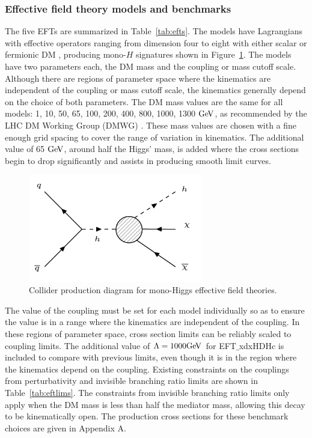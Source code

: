 \subsubsection{Effective field theory models and benchmarks}

The five EFTs are summarized in Table~\ref{tab:efts}. The models have Lagrangians with effective operators ranging from dimension four to eight with either scalar or fermionic DM \cite{McDonald:1993ex, LopezHonorez:2012kv}, producing mono-$H$ signatures shown in Figure~\ref{fig:eftsig}. The models have two parameters each, the DM mass and the coupling or mass cutoff scale. Although there are regions of parameter space where the kinematics are independent of the coupling or mass cutoff scale, the kinematics generally depend on the choice of both parameters. The DM mass values are the same for all models: 1, 10, 50, 65, 100, 200, 400, 800, 1000, 1300 $\mathrm{Ge\kern -0.1em V}$, as recommended by the LHC DM Working Group (DMWG) \cite{Abercrombie:2015wmb}. These mass values are chosen with a fine enough grid spacing to cover the range of variation in kinematics. The additional value of 65 $\mathrm{Ge\kern -0.1em V}$, around half the Higgs' mass, is added where the cross sections begin to drop significantly and assists in producing smooth limit curves.

\begin{figure}[tbh]
\centering
\includegraphics[width=3in]{figures/eftsig.png}
\caption{Collider production diagram for mono-Higgs effective field theories.}
\label{fig:eftsig}
\end{figure}

The value of the coupling must be set for each model individually so as to ensure the value is in a range where the kinematics are independent of the coupling. In these regions of parameter space, cross section limits can be reliably scaled to coupling limits. The additional value of $\Lambda = 1000 \mathrm{Ge\kern -0.1em V}$ for EFT$\_$xdxHDHc is included to compare with previous limits, even though it is in the region where the kinematics depend on the coupling. Existing constraints on the couplings from perturbativity \cite{Carpenter:2013xra} and invisible branching ratio limits \cite{Belanger:2013kya, PhysRevD.86.010001} are shown in Table~\ref{tab:eftlims}. The constraints from invisible branching ratio limits only apply when the DM mass is less than half the mediator mass, allowing this decay to be kinematically open. The production cross sections for these benchmark choices are given in Appendix A.

